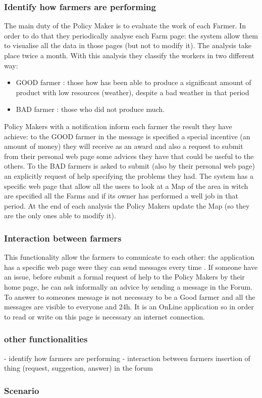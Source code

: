 \documentclass{article}
\begin{document}
\subsubsection{Identify how farmers are performing}
The main duty of the Policy Maker is to evaluate the work of each Farmer. 
In order to do that they periodically analyse each Farm page: the system allow them to visualise all the  data in those pages (but not to modify it).
The analysis take place twice a month.
With this analysis they classify the workers in two different way:
\begin{itemize}
    \item GOOD farmer : those how has been able to produce a significant amount of product with low resources (weather), despite a bad weather in that period
    \item BAD farmer : those who did not produce much.
\end{itemize}
Policy Makers with a notification inform each farmer the result they have achieve: 
to the GOOD farmer in the message is specified a special incentive (an amount of money) they will receive as an award and also a request to submit from their personal web page some advices they have that could be useful to the others. 
To the BAD farmers is asked to submit (also by their personal web page) an explicitly request of help specifying the problems they had.
The system has a specific web page that allow all the users to look at a Map of the area in witch are specified all the Farms and if its owner has performed a well job in that period.
At the end of each analysis the Policy Makers update the Map (so they are the only ones able to modify it).



\subsubsection{Interaction between farmers}
This functionality allow the farmers to comunicate to each other: 
the application has a specific web page were they can send messages every time .
If someone have an issue, before submit a formal request of help to the Policy Makers by their home page, he can ask informally an advice by sending a message in the Forum.
To answer to someones message is not necessary to be a Good farmer and all the messages are visible to everyone and 24h. 
It is an OnLine application so in order to read or write on this page is necessary an internet connection.


\subsubsection{other functionalities}
- identify how farmers are performing
- interaction between farmers
insertion of thing (request, suggestion, answer) in the forum

\subsubsection{Scenario}
\end{document}
